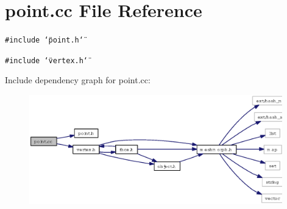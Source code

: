 \section{point.cc File Reference}
\label{point_8cc}
{\tt \#include \char`\"{}point.h\char`\"{}}\par
{\tt \#include \char`\"{}vertex.h\char`\"{}}\par


Include dependency graph for point.cc:\begin{figure}[H]
\begin{center}
\leavevmode
\includegraphics[width=311pt]{point_8cc__incl}
\end{center}
\end{figure}
